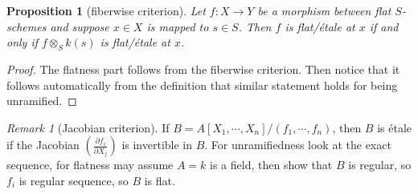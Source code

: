 \documentclass[leqno]{amsart}
\newcommand{\1}{\mathbf{1}}
\newtheorem{prop}[thm]{Proposition}
\theoremstyle{definition}
\theoremstyle{remark}
\newtheorem{rem}[thm]{Remark}
\begin{document}
\begin{prop}[fiberwise criterion]
	Let $f\colon X\to Y$ be a morphism
	between flat $S$-schemes
	and suppose $x\in X$ is mapped to  $s\in S$.
	Then  $f$ is  flat/\'{e}tale at $x$
	if and only if $f\otimes_Sk(s)$
	is flat/\'{e}tale at $x$.
\end{prop}
\begin{proof}
	The flatness part follows from the fiberwise criterion.
	Then notice that it follows automatically from the 
	definition that similar statement holds for 
	being unramified.
\end{proof}

\begin{rem}[Jacobian criterion]
	If $B=A[X_1,\cdots,X_n]/(f_1,\cdots,f_n)$,
	then $B$ is \'{e}tale if 
	the Jacobian $(\frac{\partial f_i}{\partial X_j})$ 
	is invertible in $B$.
	For unramifiedness look at the exact sequence,
	for flatness may assume $A=k$ is a field,
	then show that $B$ is regular,
	so  $f_i$ is regular sequence,
	so  $B$ is flat.
\end{rem}
\end{document}
